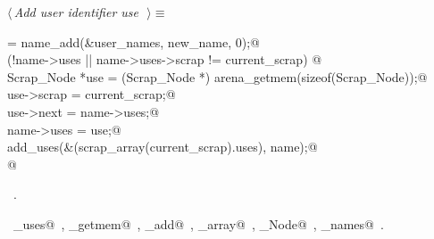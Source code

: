 \documentclass{report}
\begin{document}
\begin{flushleft} \small
\begin{minipage}{\linewidth} \label{scrap166}
$\langle\,${\it Add user identifier use}\nobreak\ {\footnotesize {}}$\,\rangle\equiv$
\vspace{-1ex}
\begin{list}{}{} \item
\mbox{}\verb@name = name_add(&user_names, new_name, 0);@\\
\mbox{}\verb@if (!name->uses || name->uses->scrap != current_scrap) {@\\
\mbox{}\verb@  Scrap_Node *use = (Scrap_Node *) arena_getmem(sizeof(Scrap_Node));@\\
\mbox{}\verb@  use->scrap = current_scrap;@\\
\mbox{}\verb@  use->next = name->uses;@\\
\mbox{}\verb@  name->uses = use;@\\
\mbox{}\verb@  add_uses(&(scrap_array(current_scrap).uses), name);@\\
\mbox{}\verb@}@{\NWsep}
\end{list}
\vspace{-1ex}
\footnotesize\addtolength{\baselineskip}{-1ex}
\begin{list}{}{\setlength{\itemsep}{-\parsep}\setlength{\itemindent}{-\leftmargin}}
\item \NWtxtMacroRefIn\ .
\end{list}
\vspace{-2ex}
\footnotesize\addtolength{\baselineskip}{-1ex}
\begin{list}{}{\setlength{\itemsep}{-\parsep}\setlength{\itemindent}{-\leftmargin}}
\item \NWtxtIdentsUsed\nobreak\  \verb@add_uses@\nobreak\ , \verb@arena_getmem@\nobreak\ , \verb@name_add@\nobreak\ , \verb@scrap_array@\nobreak\ , \verb@Scrap_Node@\nobreak\ , \verb@user_names@\nobreak\ .\end{list}
\end{minipage}\\[4ex]
\end{flushleft}
\end{document}
